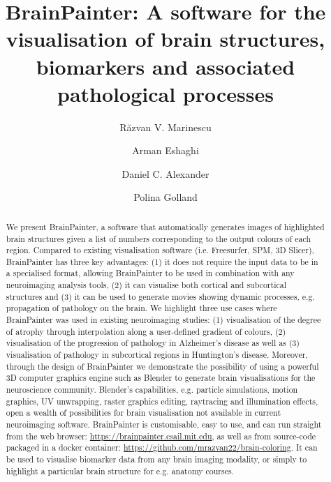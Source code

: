 \documentclass[final,times,twocolumn,authoryear]{elsarticle}
\begin{document}
\begin{frontmatter}

\title{\textbf{BrainPainter: A software for the visualisation of brain structures, biomarkers and associated pathological processes}}


\address[mit]{Computer Science and Artificial Intelligence Laboratory, Massachusetts Institute of Technology, Cambridge, USA, MA 02139}
\address[ucl]{Centre for Medical Image Computing, University College London, Gower Street, London, United Kingdom, WC1E 6BT}
\address[ion]{Queen Square MS Centre, UCL Institute of Neurology, UK
\frontFig
}



\author[mit,ucl]{R\u{a}zvan V. Marinescu}
\author[ucl,ion]{Arman Eshaghi}
\author[ucl]{Daniel C. Alexander}
\author[mit]{Polina Golland}



\begin{abstract}
We present BrainPainter, a software that automatically generates images of highlighted brain structures given a list of numbers corresponding to the output colours of each region. Compared to existing visualisation software (i.e. Freesurfer, SPM, 3D Slicer), BrainPainter has three key advantages: (1) it does not require the input data to be in a specialised format, allowing BrainPainter to be used in combination with any neuroimaging analysis tools, (2) it can visualise both cortical and subcortical structures and (3) it can be used to generate movies showing dynamic processes, e.g. propagation of pathology on the brain. We highlight three use cases where BrainPainter was used in existing neuroimaging studies: (1) visualisation of the degree of atrophy through interpolation along a user-defined gradient of colours, (2) visualisation of the progression of pathology in Alzheimer's disease as well as (3) visualisation of pathology in subcortical regions in Huntington's disease. Moreover, through the design of BrainPainter we demonstrate the possibility of using a powerful 3D computer graphics engine such as Blender to generate brain visualisations for the neuroscience community. Blender's capabilities, e.g. particle simulations, motion graphics, UV unwrapping, raster graphics editing, raytracing and illumination effects, open a wealth of possibilities for brain visualisation not available in current neuroimaging software. BrainPainter is customisable, easy to use, and can run straight from the web browser: \url{https://brainpainter.csail.mit.edu}, as well as from source-code packaged in a docker container: \url{https://github.com/mrazvan22/brain-coloring}. It can be used to visualise biomarker data from any brain imaging modality, or simply to highlight a particular brain structure for e.g. anatomy courses.


\end{abstract}
\end{frontmatter}
\end{document}
